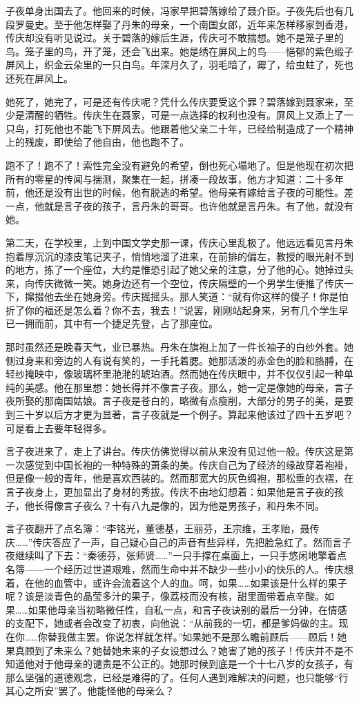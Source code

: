 \documentclass[UTF8]{ctexart}
\begin{document}
子夜单身出国去了。他回来的时候，冯家早把碧落嫁给了聂介臣。子夜先后也有几段罗曼史。至于他怎样娶了丹朱的母亲，一个南国女郎，近年来怎样移家到香港，传庆却没有听见说过。关于碧落的嫁后生涯，传庆可不敢揣想。她不是笼子里的鸟。笼子里的鸟，开了笼，还会飞出来。她是绣在屏风上的鸟——悒郁的紫色缎子屏风上，织金云朵里的一只白鸟。年深月久了，羽毛暗了，霉了，给虫蛀了，死也还死在屏风上。

她死了，她完了，可是还有传庆呢？凭什么传庆要受这个罪？碧落嫁到聂家来，至少是清醒的牺牲。传庆生在聂家，可是一点选择的权利也没有。屏风上又添上了一只鸟，打死他也不能飞下屏风去。他跟着他父亲二十年，已经给制造成了一个精神上的残废，即使给了他自由，他也跑不了。

跑不了！跑不了！索性完全没有避免的希望，倒也死心塌地了。但是他现在初次把所有的零星的传闻与揣测，聚集在一起，拼凑一段故事，他方才知道：二十多年前，他还是没有出世的时候，他有脱逃的希望。他母亲有嫁给言子夜的可能性。差一点，他就是言子夜的孩子，言丹朱的哥哥。也许他就是言丹朱。有了他，就没有她。 

第二天，在学校里，上到中国文学史那一课，传庆心里乱极了。他远远看见言丹朱抱着厚沉沉的漆皮笔记夹子，悄悄地溜了进来，在前排的偏左，教授的眼光射不到的地方，拣了一个座位，大约是惟恐引起了她父亲的注意，分了他的心。她掉过头来，向传庆微微一笑。她身边还有一个空位，传庆隔壁的一个男学生便推了传庆一下，撺掇他去坐在她身旁。传庆摇摇头。那人笑道：“就有你这样的傻子！你是怕折了你的福还是怎么着？你不去，我去！”说罢，刚刚站起身来，另有几个学生早已一拥而前，其中有一个捷足先登，占了那座位。

那时虽然还是晚春天气，业已暴热。丹朱在旗袍上加了一件长袖子的白纱外套。她侧过身来和旁边的人有说有笑的，一手托着腮。她那活泼的赤金色的脸和胳膊，在轻纱掩映中，像玻璃杯里滟滟的琥珀酒。然而她在传庆眼中，并不仅仅引起一种单纯的美感。他在那里想：她长得并不像言子夜。那么，她一定是像她的母亲，言子夜所娶的那南国姑娘。言子夜是苍白的，略微有点瘦削，大部分的男子的美，是要到三十岁以后方才更为显著，言子夜就是一个例子。算起来他该过了四十五岁吧？可是看上去要年轻得多。

言子夜进来了，走上了讲台。传庆仿佛觉得以前从来没有见过他一般。传庆这是第一次感觉到中国长袍的一种特殊的萧条的美。传庆自己为了经济的缘故穿着袍褂，但是像一般的青年，他是喜欢西装的。然而那宽大的灰色绸袍，那松垂的衣褶，在言子夜身上，更加显出了身材的秀拔。传庆不由地幻想着：如果他是言子夜的孩子，他长得像言子夜么？十有八九是像的，因为他是男孩子，和丹朱不同。

言子夜翻开了点名簿：“李铭光，董德基，王丽芬，王宗维，王孝贻，聂传庆……”传庆答应了一声，自己疑心自己的声音有些异样，先把脸急红了。然而言子夜继续叫了下去：“秦德芬，张师贤……”一只手撑在桌面上，一只手悠闲地擎着点名簿——一个经历过世道艰难，然而生命中并不缺少一些小小的快乐的人。传庆想着，在他的血管中，或许会流着这个人的血。呵，如果……如果该是什么样的果子呢？该是淡青色的晶莹多汁的果子，像荔枝而没有核，甜里面带着点辛酸。如果……如果他母亲当初略微任性，自私一点，和言子夜诀别的最后一分钟，在情感的支配下，她或者会改变了初衷，向他说：“从前我的一切，都是爹妈做的主。现在你……你替我做主罢。你说怎样就怎样。”如果她不是那么瞻前顾后——顾后！她果真顾到了未来么？她替她未来的子女设想过么？她害了她的孩子！传庆并不是不知道他对于他母亲的谴责是不公正的。她那时候到底是一个十七八岁的女孩子，有那么坚强的道德观念，已经是难得的了。任何人遇到难解决的问题，也只能够“行其心之所安”罢了。他能怪他的母亲么？
\end{document}
